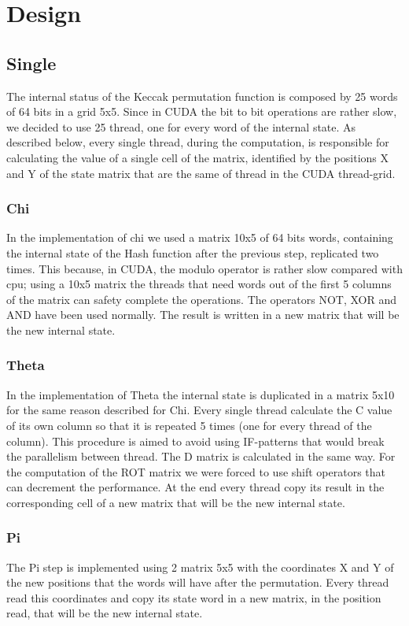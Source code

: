 \chapter{Design}
\section{Single}
The internal status of the Keccak permutation function is composed by 25 words of 64 bits in a grid 5x5. Since in CUDA the bit to bit operations are rather slow, we decided to use 25 thread, one for every word of the internal state. As described below, every single thread, during the computation, is responsible for calculating the value of a single cell of the matrix, identified by the positions X and Y of the state matrix that are the same of thread in the CUDA thread-grid.
\subsection{Chi}
In the implementation of chi we used a matrix 10x5 of 64 bits words, containing the internal state of the Hash function after the previous step, replicated two times. This because, in CUDA, the modulo operator is rather slow compared with cpu; using a 10x5 matrix the threads that need words out of the first 5 columns of the matrix can safety complete the operations. The operators NOT, XOR and AND have been used normally. The result is written in a new matrix that will be the new internal state.
\subsection{Theta}
In the implementation of Theta the internal state is duplicated in a matrix 5x10 for the same reason described for Chi. Every single thread calculate the C value of its own column so that it is repeated 5 times (one for every thread of the column). This procedure is aimed to avoid using IF-patterns that would break the parallelism between thread. The D matrix is calculated in the same way. For the computation of the ROT matrix we were forced to use shift operators that can decrement the performance. At the end every thread copy its result in the corresponding cell of a new matrix that will be the new internal state.
\subsection{Pi}
The Pi step is implemented using 2 matrix 5x5 with the coordinates X and Y of the new positions that the words will have after the permutation. Every thread read this coordinates and copy its state word in a new matrix, in the position read, that will be the new internal state.

